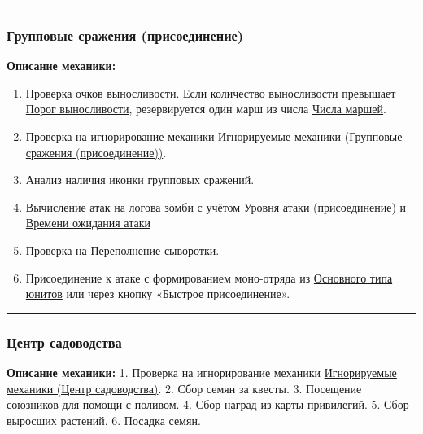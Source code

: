 \documentclass[
]{article}
\providecommand{\tightlist}{%
  \setlength{\itemsep}{0pt}\setlength{\parskip}{0pt}}
\begin{document}
\begin{center}\rule{0.5\linewidth}{0.5pt}\end{center}

\subsubsection{Групповые сражения
(присоединение)}\label{ux433ux440ux443ux43fux43fux43eux432ux44bux435-ux441ux440ux430ux436ux435ux43dux438ux44f-ux43fux440ux438ux441ux43eux435ux434ux438ux43dux435ux43dux438ux435}

\textbf{Описание механики:}

\begin{enumerate}
\def\labelenumi{\arabic{enumi}.}
\tightlist
\item
  Проверка очков выносливости. Если количество выносливости превышает
  \hyperref[stamina_threshold]{Порог выносливости}, резервируется один
  марш из числа \hyperref[march_max_count]{Числа маршей}.
\item
  Проверка на игнорирование механики
  \hyperref[ignor_states]{Игнорируемые механики (Групповые сражения
  (присоединение))}.
\item
  Анализ наличия иконки групповых сражений.
\item
  Вычисление атак на логова зомби с учётом
  \hyperref[group_fight_min_lvl]{Уровня атаки (присоединение)} и
  \hyperref[lair_time]{Времени ожидания атаки}
\item
  Проверка на \hyperref[serum_limit_ignore]{Переполнение сыворотки}.
\item
  Присоединение к атаке с формированием моно-отряда из
  \hyperref[unit_type]{Основного типа юнитов} или через кнопку «Быстрое
  присоединение».
\end{enumerate}

\begin{center}\rule{0.5\linewidth}{0.5pt}\end{center}

\subsubsection{Центр
садоводства}\label{ux446ux435ux43dux442ux440-ux441ux430ux434ux43eux432ux43eux434ux441ux442ux432ux430}

\textbf{Описание механики:} 1. Проверка на игнорирование механики
\hyperref[ignor_states]{Игнорируемые механики (Центр садоводства)}. 2.
Сбор семян за квесты. 3. Посещение союзников для помощи с поливом. 4.
Сбор наград из карты привилегий. 5. Сбор выросших растений. 6. Посадка
семян.
\end{document}
